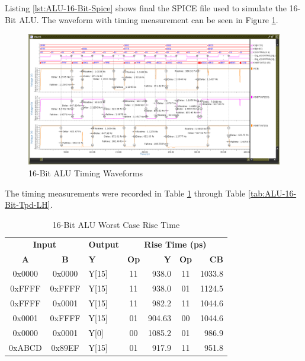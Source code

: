 \documentclass[11pt]{article}
\begin{document}
			Listing \ref{lst:ALU-16-Bit-Spice} shows final the SPICE file used to simulate the 16-Bit ALU.  The waveform with timing measurement can be seen in Figure \ref{fig:alu-16-bit-full-timing}.
		
			\begin{figure}[H]
				\centering
				\includegraphics[width=1\linewidth]{"Pictures/ALU 16-Bit Full Timing"}
				\caption{16-Bit ALU Timing Waveforms}
				\label{fig:alu-16-bit-full-timing}
			\end{figure}
			
			The timing measurements were recorded in Table \ref{tab:ALU-16-Bit-Risetime} through Table \ref{tab:ALU-16-Bit-Tpd-LH}.
		
			\begin{table}[H]
				\centering
				\caption{16-Bit ALU Worst Case Rise Time}
				\label{tab:ALU-16-Bit-Risetime}
				\begin{tabular}{|cclcrcr|}
					\hline
					\multicolumn{2}{|c}{\textbf{Input}} & \textbf{Output} & \multicolumn{4}{c|}{\textbf{Rise Time (ps)}} \\
					\textbf{A} & \textbf{B} & \textbf{Y} & \textbf{Op} & \textbf{Y} & \textbf{Op} & \textbf{CB} \\
					\hline
					0x0000 & 0x0000 & Y{[}15{]} & 11 & 938.0 & 11 & 1033.8 \\
					0xFFFF & 0xFFFF & Y{[}15{]} & 11 & 938.0 & 01 & 1124.5 \\
					0xFFFF & 0x0001 & Y{[}15{]} & 11 & 982.2 & 11 & 1044.6 \\
					0x0001 & 0xFFFF & Y{[}15{]} & 01 & 904.63 & 00 & 1044.6 \\
					0x0000 & 0x0001 & Y{[}0{]} & 00 & 1085.2 & 01 & 986.9 \\
					0xABCD & 0x89EF & Y{[}15{]} & 01 & 917.9 & 11 & 951.8 \\
					\hline
				\end{tabular}
			\end{table}
		
\end{document}
